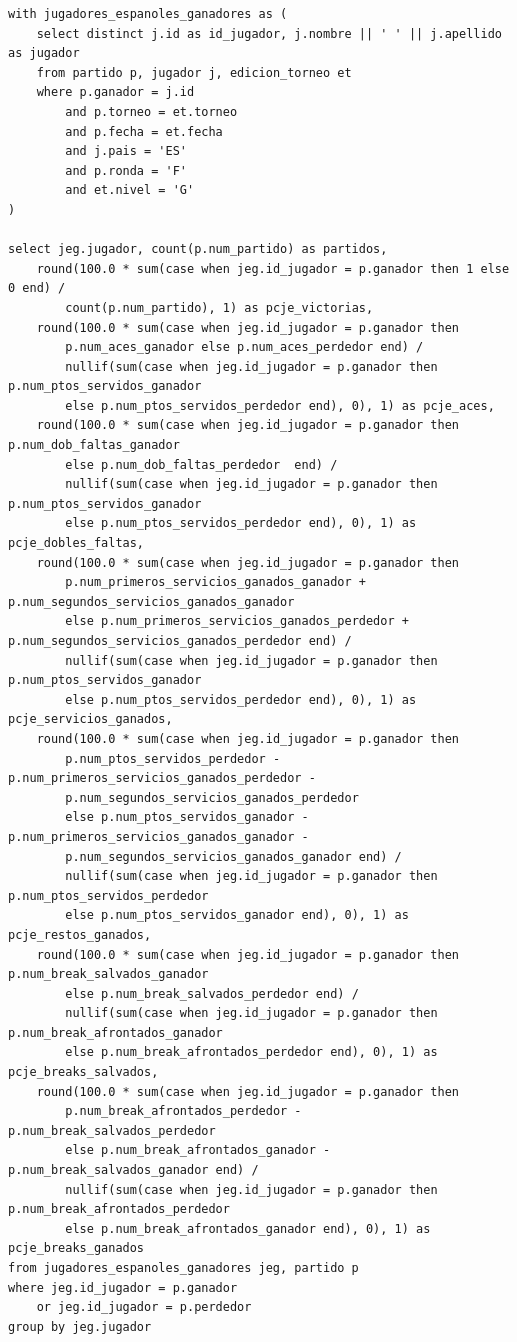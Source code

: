 \begin{verbatim}
with jugadores_espanoles_ganadores as (
    select distinct j.id as id_jugador, j.nombre || ' ' || j.apellido as jugador
    from partido p, jugador j, edicion_torneo et 
    where p.ganador = j.id 
        and p.torneo = et.torneo 
        and p.fecha = et.fecha
        and j.pais = 'ES'
        and p.ronda = 'F'
        and et.nivel = 'G'
)

select jeg.jugador, count(p.num_partido) as partidos,
    round(100.0 * sum(case when jeg.id_jugador = p.ganador then 1 else 0 end) / 
		count(p.num_partido), 1) as pcje_victorias, 
    round(100.0 * sum(case when jeg.id_jugador = p.ganador then 
		p.num_aces_ganador else p.num_aces_perdedor end) / 
        nullif(sum(case when jeg.id_jugador = p.ganador then p.num_ptos_servidos_ganador 
		else p.num_ptos_servidos_perdedor end), 0), 1) as pcje_aces, 
    round(100.0 * sum(case when jeg.id_jugador = p.ganador then p.num_dob_faltas_ganador 
		else p.num_dob_faltas_perdedor  end) / 
        nullif(sum(case when jeg.id_jugador = p.ganador then p.num_ptos_servidos_ganador 
		else p.num_ptos_servidos_perdedor end), 0), 1) as pcje_dobles_faltas, 
    round(100.0 * sum(case when jeg.id_jugador = p.ganador then 
		p.num_primeros_servicios_ganados_ganador + p.num_segundos_servicios_ganados_ganador 
        else p.num_primeros_servicios_ganados_perdedor + p.num_segundos_servicios_ganados_perdedor end) / 
        nullif(sum(case when jeg.id_jugador = p.ganador then p.num_ptos_servidos_ganador 
		else p.num_ptos_servidos_perdedor end), 0), 1) as pcje_servicios_ganados, 
    round(100.0 * sum(case when jeg.id_jugador = p.ganador then 
		p.num_ptos_servidos_perdedor - p.num_primeros_servicios_ganados_perdedor - 
		p.num_segundos_servicios_ganados_perdedor 
        else p.num_ptos_servidos_ganador - p.num_primeros_servicios_ganados_ganador - 
		p.num_segundos_servicios_ganados_ganador end) / 
        nullif(sum(case when jeg.id_jugador = p.ganador then p.num_ptos_servidos_perdedor 
		else p.num_ptos_servidos_ganador end), 0), 1) as pcje_restos_ganados,
    round(100.0 * sum(case when jeg.id_jugador = p.ganador then p.num_break_salvados_ganador 
		else p.num_break_salvados_perdedor end) / 
        nullif(sum(case when jeg.id_jugador = p.ganador then p.num_break_afrontados_ganador 
		else p.num_break_afrontados_perdedor end), 0), 1) as pcje_breaks_salvados, 
    round(100.0 * sum(case when jeg.id_jugador = p.ganador then 
		p.num_break_afrontados_perdedor - p.num_break_salvados_perdedor 
        else p.num_break_afrontados_ganador - p.num_break_salvados_ganador end) / 
        nullif(sum(case when jeg.id_jugador = p.ganador then p.num_break_afrontados_perdedor 
		else p.num_break_afrontados_ganador end), 0), 1) as pcje_breaks_ganados
from jugadores_espanoles_ganadores jeg, partido p
where jeg.id_jugador = p.ganador 
	or jeg.id_jugador = p.perdedor
group by jeg.jugador
\end{verbatim}

